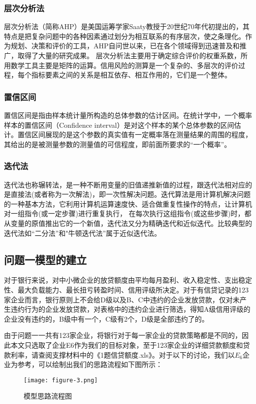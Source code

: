 \documentclass[dvipsnames,withoutpreface,bwprint]{cumcmthesis}
\begin{document}
\subsubsection{层次分析法}
\par 层次分析法（简称AHP）是美国运筹学家Saaty教授于20世纪70年代初提出的，其特点是把复杂问题中的各种因素通过划分为相互联系的有序层次，使之条理化。作为规划、决策和评价的工具，AHP自问世以来，已在各个领域得到迅速普及和推广，取得了大量的研究成果。
层次分析法主要用于确定综合评价的权重系数，所用数学工具主要是矩阵的运算。信用风险的测算是一个复杂的、多层次的评价过程，每个指标要素之间的关系是相互依存、相互作用的，它们是一个整体。
\subsubsection{置信区间}
\par 置信区间是指由样本统计量所构造的总体参数的估计区间。在统计学中，一个概率样本的置信区间（Confidence interval）是对这个样本的某个总体参数的区间估计。置信区间展现的是这个参数的真实值有一定概率落在测量结果的周围的程度，其给出的是被测量参数的测量值的可信程度，即前面所要求的“一个概率”。
\subsubsection{迭代法}
\par 迭代法也称辗转法，是一种不断用变量的旧值递推新值的过程，跟迭代法相对应的是直接法(或者称为一次解法)，即一次性解决问题。迭代算法是用计算机解决问题的一种基本方法，它利用计算机运算速度快、适合做重复性操作的特点，让计算机对一组指令(或一定步骤)进行重复执行，
在每次执行这组指令(或这些步骤)时，都从变量的原值推出它的一个新值，迭代法又分为精确迭代和近似迭代。比较典型的迭代法如“二分法”和"牛顿迭代法”属于近似迭代法。
\subsection{问题一模型的建立}
对于银行来说，对中小微企业的放贷额度由平均每月盈利、收入稳定性、支出稳定性、最大负载能力、最长扭亏转盈时间、信用评级所决定。对于有信贷记录的123家企业而言，银行原则上不会给D级以及B、C中违约的企业发放贷款，仅对未产生违约行为的企业发放贷款，对表格中的违约企业进行筛选，得知A级信用评级的企业没有违约的，B级中有一个，C级有2个，D级是全部违约了的。
\par 由于问题一一共有123家企业，将银行对于每一家企业的贷款策略都是不同的，因此本文只选取了企业E6作为我们的目标对象，至于123家企业的详细贷款额度和贷款利率，请查阅支撑材料中的《1题信贷额度.xls》。对于以下的讨论，我们以$E_6$企业为参考，可以绘制出我们的思路流程如下图所示：
\begin{figure}[H]
    \centering
    \texttt{[image: figure-3.png]}
    \caption{模型思路流程图}
    \label{fig:1}%
\end{figure}
\end{document}
